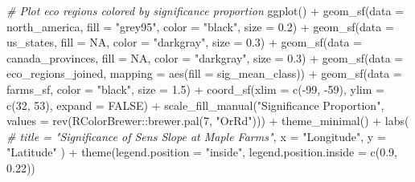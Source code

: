 \documentclass[
]{article}
\newenvironment{Shaded}{}{}
\newcommand{\AttributeTok}[1]{\textcolor[rgb]{0.49,0.56,0.16}{#1}}
\newcommand{\CommentTok}[1]{\textcolor[rgb]{0.38,0.63,0.69}{\textit{#1}}}
\newcommand{\ConstantTok}[1]{\textcolor[rgb]{0.53,0.00,0.00}{#1}}
\newcommand{\DecValTok}[1]{\textcolor[rgb]{0.25,0.63,0.44}{#1}}
\newcommand{\FloatTok}[1]{\textcolor[rgb]{0.25,0.63,0.44}{#1}}
\newcommand{\FunctionTok}[1]{\textcolor[rgb]{0.02,0.16,0.49}{#1}}
\newcommand{\NormalTok}[1]{#1}
\newcommand{\SpecialCharTok}[1]{\textcolor[rgb]{0.25,0.44,0.63}{#1}}
\newcommand{\StringTok}[1]{\textcolor[rgb]{0.25,0.44,0.63}{#1}}
\begin{document}
\begin{Shaded}
\begin{Highlighting}[]
\CommentTok{\# Plot eco regions colored by significance proportion}
\FunctionTok{ggplot}\NormalTok{() }\SpecialCharTok{+}
  \FunctionTok{geom\_sf}\NormalTok{(}\AttributeTok{data =}\NormalTok{ north\_america, }\AttributeTok{fill =} \StringTok{"grey95"}\NormalTok{, }\AttributeTok{color =} \StringTok{"black"}\NormalTok{, }\AttributeTok{size =} \FloatTok{0.2}\NormalTok{) }\SpecialCharTok{+}
  \FunctionTok{geom\_sf}\NormalTok{(}\AttributeTok{data =}\NormalTok{ us\_states, }\AttributeTok{fill =} \ConstantTok{NA}\NormalTok{, }\AttributeTok{color =} \StringTok{"darkgray"}\NormalTok{, }\AttributeTok{size =} \FloatTok{0.3}\NormalTok{) }\SpecialCharTok{+}
  \FunctionTok{geom\_sf}\NormalTok{(}\AttributeTok{data =}\NormalTok{ canada\_provinces, }\AttributeTok{fill =} \ConstantTok{NA}\NormalTok{, }\AttributeTok{color =} \StringTok{"darkgray"}\NormalTok{, }\AttributeTok{size =} \FloatTok{0.3}\NormalTok{) }\SpecialCharTok{+}
  \FunctionTok{geom\_sf}\NormalTok{(}\AttributeTok{data =}\NormalTok{ eco\_regions\_joined, }\AttributeTok{mapping =} \FunctionTok{aes}\NormalTok{(}\AttributeTok{fill =}\NormalTok{ sig\_mean\_class)) }\SpecialCharTok{+}
  \FunctionTok{geom\_sf}\NormalTok{(}\AttributeTok{data =}\NormalTok{ farms\_sf, }\AttributeTok{color =} \StringTok{"black"}\NormalTok{, }\AttributeTok{size =} \FloatTok{1.5}\NormalTok{) }\SpecialCharTok{+}
  \FunctionTok{coord\_sf}\NormalTok{(}\AttributeTok{xlim =} \FunctionTok{c}\NormalTok{(}\SpecialCharTok{{-}}\DecValTok{99}\NormalTok{, }\SpecialCharTok{{-}}\DecValTok{59}\NormalTok{), }\AttributeTok{ylim =} \FunctionTok{c}\NormalTok{(}\DecValTok{32}\NormalTok{, }\DecValTok{53}\NormalTok{), }\AttributeTok{expand =} \ConstantTok{FALSE}\NormalTok{) }\SpecialCharTok{+}
  \FunctionTok{scale\_fill\_manual}\NormalTok{(}\StringTok{"Significance Proportion"}\NormalTok{, }
                    \AttributeTok{values =} \FunctionTok{rev}\NormalTok{(RColorBrewer}\SpecialCharTok{::}\FunctionTok{brewer.pal}\NormalTok{(}\DecValTok{7}\NormalTok{, }\StringTok{"OrRd"}\NormalTok{))) }\SpecialCharTok{+}
  \FunctionTok{theme\_minimal}\NormalTok{() }\SpecialCharTok{+}
  \FunctionTok{labs}\NormalTok{(}
    \CommentTok{\# title = "Significance of Sens Slope at Maple Farms",}
    \AttributeTok{x =} \StringTok{"Longitude"}\NormalTok{,}
    \AttributeTok{y =} \StringTok{"Latitude"}
\NormalTok{  ) }\SpecialCharTok{+}
  \FunctionTok{theme}\NormalTok{(}\AttributeTok{legend.position =} \StringTok{"inside"}\NormalTok{,}
        \AttributeTok{legend.position.inside =} \FunctionTok{c}\NormalTok{(}\FloatTok{0.9}\NormalTok{, }\FloatTok{0.22}\NormalTok{))}
\end{Highlighting}
\end{Shaded}
\end{document}
